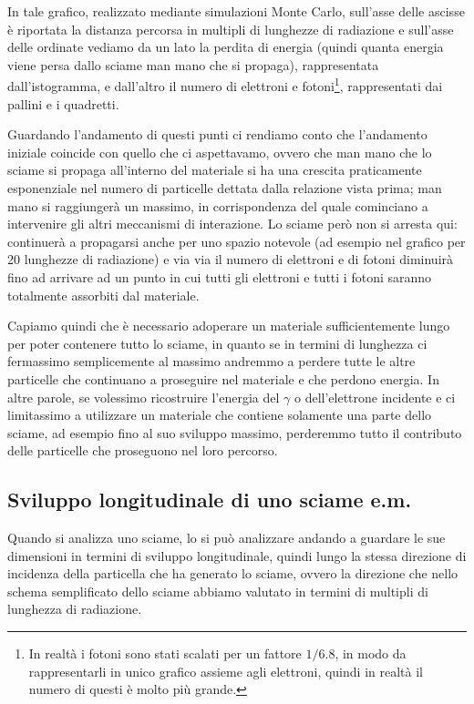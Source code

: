 In tale grafico, realizzato mediante simulazioni Monte Carlo, sull'asse delle ascisse è riportata la distanza percorsa in multipli di lunghezze di radiazione e sull'asse delle ordinate vediamo da un lato la perdita di energia (quindi quanta energia viene persa dallo sciame man mano che si propaga), rappresentata dall'istogramma, e dall'altro il numero di elettroni e fotoni\footnote{In realtà i fotoni sono stati scalati per un fattore $1/6.8$, in modo da rappresentarli in unico grafico assieme agli elettroni, quindi in realtà il numero di questi è molto più grande.}, rappresentati dai pallini e i quadretti.

Guardando l'andamento di questi punti ci rendiamo conto che l'andamento iniziale coincide con quello che ci aspettavamo, ovvero che man mano che lo sciame si propaga all'interno del materiale si ha una crescita praticamente esponenziale nel numero di particelle dettata dalla relazione vista prima; man mano si raggiungerà un massimo, in corrispondenza del quale cominciano a intervenire gli altri meccanismi di interazione. Lo sciame però non si arresta qui: continuerà a propagarsi anche per uno spazio notevole (ad esempio nel grafico per 20 lunghezze di radiazione) e via via il numero di elettroni e di fotoni diminuirà fino ad arrivare ad un punto in cui tutti gli elettroni e tutti i fotoni saranno totalmente assorbiti dal materiale.

Capiamo quindi che è necessario adoperare un materiale sufficientemente lungo per poter contenere tutto lo sciame, in quanto se in termini di lunghezza ci fermassimo semplicemente al massimo andremmo a perdere tutte le altre particelle che continuano a proseguire nel materiale e che perdono energia. In altre parole, se volessimo ricostruire l'energia del $\gamma$ o dell'elettrone incidente e ci limitassimo a utilizzare un materiale che contiene solamente una parte dello sciame, ad esempio fino al suo sviluppo massimo, perderemmo tutto il contributo delle particelle che proseguono nel loro percorso.

\subsection{Sviluppo longitudinale di uno sciame e.m.}

Quando si analizza uno sciame, lo si può analizzare andando a guardare le sue dimensioni in termini di sviluppo longitudinale, quindi lungo la stessa direzione di incidenza della particella che ha generato lo sciame, ovvero la direzione che nello schema semplificato dello sciame abbiamo valutato in termini di multipli di lunghezza di radiazione.

